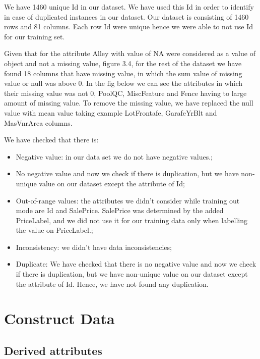 We have 1460 unique Id in our dataset. We have used this Id in order to identify in case of duplicated instances in our dataset. Our dataset is consisting of 1460 rows and 81 columns. Each row Id were unique hence we were able to not use Id for our training set.

Given that for the attribute Alley with value of NA were considered as a value of object and not a missing value, figure 3.4, for the rest of the dataset we have found 18 columns that have missing value, in which the sum value of missing value or null was above 0. In the fig below we can see the attributes in which their missing value was not 0, PoolQC, MiscFeature and Fence having to large amount of missing value.
To remove the missing value, we have replaced the null value with mean value taking example LotFrontafe, GarafeYrBlt and MasVnrArea columns.

We have checked that there is:
\begin{itemize}
    \item Negative value: in our data set we do not have negative values.;
    \item No negative value and now we check if there is duplication, but we have non-unique value on our dataset except the attribute of Id;
    \item Out-of-range values: the attributes we didn’t consider while training out mode are Id and SalePrice. SalePrice was determined by the added PriceLabel, and we did not use it for our training data only when labelling the value on PriceLabel.;
    \item Inconsistency: we didn’t have data inconsistencies;
    \item Duplicate: We have checked that there is no negative value and now we check if there is duplication, but we have non-unique value on our dataset except the attribute of Id. Hence, we have not found any duplication.
\end{itemize}
     

\section{Construct Data}

\subsection{Derived attributes}

